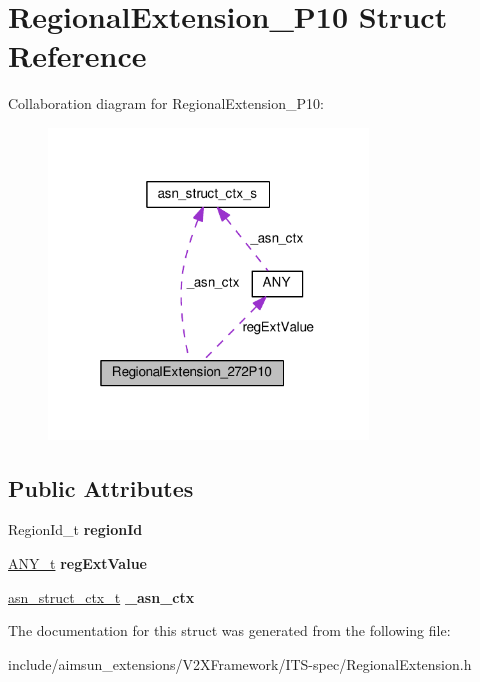 \hypertarget{structRegionalExtension__272P10}{}\section{Regional\+Extension\+\_\+P10 Struct Reference}
\label{structRegionalExtension__272P10}


Collaboration diagram for Regional\+Extension\+\_\+P10\+:\nopagebreak
\begin{figure}[H]
\begin{center}
\leavevmode
\includegraphics[width=241pt]{structRegionalExtension__272P10__coll__graph}
\end{center}
\end{figure}
\subsection*{Public Attributes}
\begin{DoxyCompactItemize}
\item 
Region\+Id\+\_\+t {\bfseries region\+Id}\hypertarget{structRegionalExtension__272P10_a0e9192d86ac77a55c71ae2cf33de5e8a}{}\label{structRegionalExtension__272P10_a0e9192d86ac77a55c71ae2cf33de5e8a}

\item 
\hyperlink{structANY}{A\+N\+Y\+\_\+t} {\bfseries reg\+Ext\+Value}\hypertarget{structRegionalExtension__272P10_a388214380406cb6c30d2aeb48f8ac4eb}{}\label{structRegionalExtension__272P10_a388214380406cb6c30d2aeb48f8ac4eb}

\item 
\hyperlink{structasn__struct__ctx__s}{asn\+\_\+struct\+\_\+ctx\+\_\+t} {\bfseries \+\_\+asn\+\_\+ctx}\hypertarget{structRegionalExtension__272P10_ad78bc310e6b60fef7679957d6693394d}{}\label{structRegionalExtension__272P10_ad78bc310e6b60fef7679957d6693394d}

\end{DoxyCompactItemize}


The documentation for this struct was generated from the following file\+:\begin{DoxyCompactItemize}
\item 
include/aimsun\+\_\+extensions/\+V2\+X\+Framework/\+I\+T\+S-\/spec/Regional\+Extension.\+h\end{DoxyCompactItemize}

